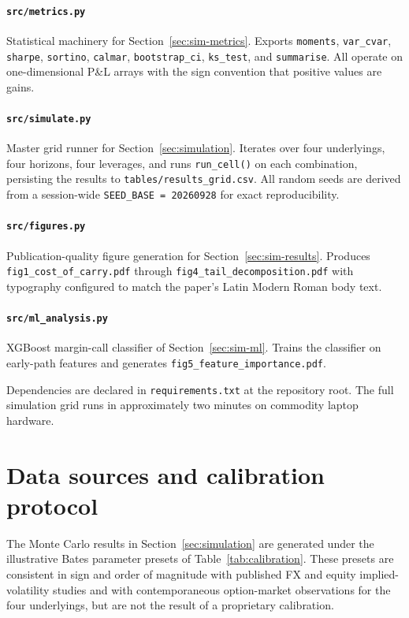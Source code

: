 \documentclass[preprint,12pt,authoryear]{elsarticle}
\theoremstyle{definition}
\begin{document}
\paragraph{\texttt{src/metrics.py}}
Statistical machinery for Section~\ref{sec:sim-metrics}. Exports
\texttt{moments}, \texttt{var\_cvar}, \texttt{sharpe},
\texttt{sortino}, \texttt{calmar}, \texttt{bootstrap\_ci},
\texttt{ks\_test}, and \texttt{summarise}. All operate on
one-dimensional P\&L arrays with the sign convention that
positive values are gains.

\paragraph{\texttt{src/simulate.py}}
Master grid runner for Section~\ref{sec:simulation}. Iterates
over four underlyings, four horizons, four leverages, and
runs \texttt{run\_cell()} on each combination, persisting the
results to \texttt{tables/results\_grid.csv}. All random seeds
are derived from a session-wide \texttt{SEED\_BASE = 20260928}
for exact reproducibility.

\paragraph{\texttt{src/figures.py}}
Publication-quality figure generation for
Section~\ref{sec:sim-results}. Produces
\texttt{fig1\_cost\_of\_carry.pdf} through
\texttt{fig4\_tail\_decomposition.pdf} with typography configured
to match the paper's Latin Modern Roman body text.

\paragraph{\texttt{src/ml\_analysis.py}}
XGBoost margin-call classifier of
Section~\ref{sec:sim-ml}. Trains the classifier on early-path
features and generates
\texttt{fig5\_feature\_importance.pdf}.

Dependencies are declared in \texttt{requirements.txt} at the
repository root. The full simulation grid runs in approximately
two minutes on commodity laptop hardware.

\section{Data sources and calibration protocol}
\label{app:data}

The Monte Carlo results in Section~\ref{sec:simulation} are
generated under the illustrative Bates parameter presets of
Table~\ref{tab:calibration}. These presets are consistent in
sign and order of magnitude with published FX and equity
implied-volatility studies \citep{Andersen2009,Bates1996} and
with contemporaneous option-market observations for the four
underlyings, but are not the result of a proprietary
calibration.
\end{document}
